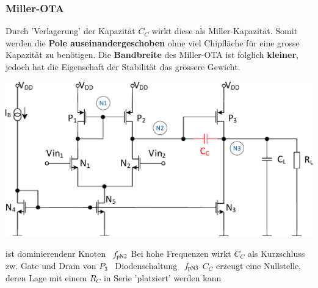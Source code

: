 \subsubsection{Miller-OTA}

Durch 'Verlagerung' der Kapazität $C_C$ wirkt diese als Miller-Kapazität. 
Somit werden die \textbf{Pole auseinandergeschoben} ohne viel Chipfläche für eine grosse Kapazität zu benötigen.
Die \textbf{Bandbreite} des Miller-OTA ist folglich \textbf{kleiner}, jedoch hat die Eigenschaft der Stabilität das grössere Gewicht.

\smallskip

\begin{minipage}[t]{0.48\columnwidth}
    \includegraphics[width=\columnwidth, align=t]{images/11_OTA_zweistufig_miller.pdf}
\end{minipage}
\hfill
\begin{minipage}[t]{0.48\columnwidth}
    \begin{outline}
        \1  ist dominierendenr Knoten \textrightarrow\ $f_{\rm pN2}$
        \1 Bei hohe Frequenzen wirkt $C_C$ als Kurzschluss zw. Gate und Drain von $P_3$ \textrightarrow\ Diodenschaltung \textrightarrow\ $f_{\rm pN3}$
        \1 $C_C$ erzeugt eine Nullstelle, deren Lage mit einem $R_C$ in Serie 'platziert' werden kann
    \end{outline} 
\end{minipage}



